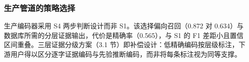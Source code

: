 \documentclass[11pt]{article}
\begin{document}
\subsubsection{{\cjkfont 生\allowbreak 产\allowbreak 管\allowbreak 道\allowbreak 的\allowbreak 策\allowbreak 略\allowbreak 选\allowbreak 择}}
{\cjkfont 生\allowbreak 产\allowbreak 编\allowbreak 码\allowbreak 器\allowbreak 采\allowbreak 用} S4 {\cjkfont 两\allowbreak 步\allowbreak 判\allowbreak 断\allowbreak 设\allowbreak 计\allowbreak 而\allowbreak 非} S1{\cjkfont 。\allowbreak 该\allowbreak 选\allowbreak 择\allowbreak 偏\allowbreak 向\allowbreak 召\allowbreak 回\allowbreak （}0.872 {\cjkfont 对} 0.634{\cjkfont ）\allowbreak 与\allowbreak 数\allowbreak 据\allowbreak 库\allowbreak 所\allowbreak 需\allowbreak 的\allowbreak 分\allowbreak 层\allowbreak 证\allowbreak 据\allowbreak 输\allowbreak 出\allowbreak ，\allowbreak 代\allowbreak 价\allowbreak 是\allowbreak 精\allowbreak 确\allowbreak 率\allowbreak （}0.565{\cjkfont ）\allowbreak ，\allowbreak 与} S1 {\cjkfont 的} F1 {\cjkfont 差\allowbreak 距\allowbreak 小\allowbreak 且\allowbreak 置\allowbreak 信\allowbreak 区\allowbreak 间\allowbreak 重\allowbreak 叠\allowbreak 。\allowbreak 三\allowbreak 层\allowbreak 证\allowbreak 据\allowbreak 分\allowbreak 级\allowbreak 方\allowbreak 案\allowbreak （}3.1 {\cjkfont 节\allowbreak ）\allowbreak 即\allowbreak 补\allowbreak 偿\allowbreak 设\allowbreak 计\allowbreak ：\allowbreak 低\allowbreak 精\allowbreak 确\allowbreak 编\allowbreak 码\allowbreak 按\allowbreak 层\allowbreak 级\allowbreak 标\allowbreak 注\allowbreak ，\allowbreak 下\allowbreak 游\allowbreak 用\allowbreak 户\allowbreak 得\allowbreak 以\allowbreak 区\allowbreak 分\allowbreak 逐\allowbreak 字\allowbreak 证\allowbreak 据\allowbreak 编\allowbreak 码\allowbreak 与\allowbreak 先\allowbreak 验\allowbreak 推\allowbreak 断\allowbreak 编\allowbreak 码\allowbreak ，\allowbreak 而\allowbreak 非\allowbreak 将\allowbreak 每\allowbreak 条\allowbreak 标\allowbreak 注\allowbreak 视\allowbreak 为\allowbreak 同\allowbreak 等\allowbreak 支\allowbreak 撑\allowbreak 。}
\end{document}
